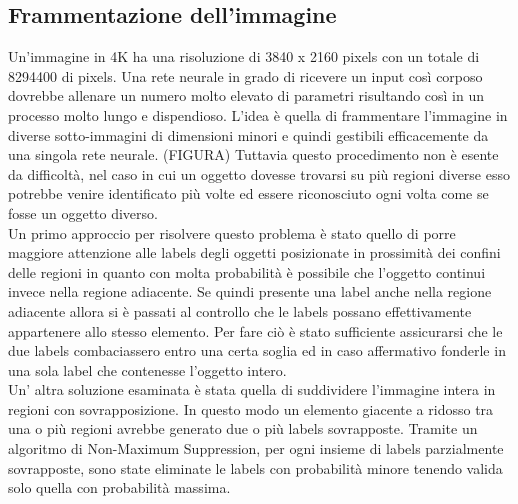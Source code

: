 \subsection{Frammentazione dell'immagine}
Un'immagine in 4K ha una risoluzione di 3840 x 2160 pixels con un totale di 8294400 di pixels. Una rete neurale in grado di ricevere un input così corposo dovrebbe allenare un numero molto elevato di parametri risultando così in un processo molto lungo e dispendioso. L'idea è quella di frammentare l'immagine in diverse sotto-immagini di dimensioni minori e quindi gestibili efficacemente da una singola rete neurale.
(FIGURA)
Tuttavia questo procedimento non è esente da difficoltà,  nel caso in cui un oggetto dovesse trovarsi su più regioni diverse esso potrebbe venire identificato più volte ed essere riconosciuto ogni volta come se fosse un oggetto diverso.\\
Un primo approccio per risolvere questo problema è stato quello di porre maggiore attenzione alle labels degli oggetti posizionate in prossimità dei confini delle regioni in quanto con molta probabilità è possibile che l'oggetto continui invece nella regione adiacente. Se quindi presente una label anche nella regione adiacente allora si è passati al controllo che le labels possano effettivamente appartenere allo stesso elemento. Per fare ciò è stato sufficiente assicurarsi che le due labels combaciassero entro una certa soglia ed in caso affermativo fonderle in una sola label che contenesse l'oggetto intero.\\
Un' altra soluzione esaminata è stata quella di suddividere l'immagine intera in regioni con sovrapposizione. In questo modo un elemento giacente a ridosso tra una o più regioni avrebbe generato due o più labels sovrapposte. Tramite un algoritmo di Non-Maximum Suppression, per ogni insieme di labels parzialmente sovrapposte, sono state eliminate le labels con probabilità minore tenendo valida solo quella con probabilità massima.